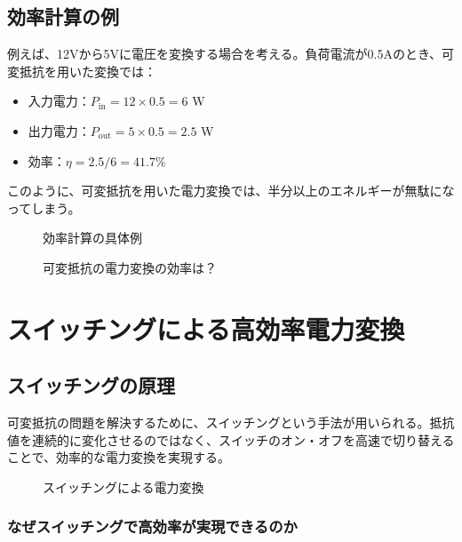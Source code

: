\subsection{効率計算の例}

例えば、12Vから5Vに電圧を変換する場合を考える。負荷電流が0.5Aのとき、可変抵抗を用いた変換では：

\begin{itemize}
\item 入力電力：$P_{\text{in}} = 12 \times 0.5 = 6$ W
\item 出力電力：$P_{\text{out}} = 5 \times 0.5 = 2.5$ W
\item 効率：$\eta = 2.5/6 = 41.7$\%
\end{itemize}

このように、可変抵抗を用いた電力変換では、半分以上のエネルギーが無駄になってしまう。

\begin{figure}[H]
\centering
{}
\caption{効率計算の具体例}
\label{fig:efficiency_calculation}
\end{figure}

\begin{figure}[H]
\centering
{}
\caption{可変抵抗の電力変換の効率は？}
\label{fig:resistor_efficiency}
\end{figure}

\section{スイッチングによる高効率電力変換}

\subsection{スイッチングの原理}

可変抵抗の問題を解決するために、スイッチングという手法が用いられる。抵抗値を連続的に変化させるのではなく、スイッチのオン・オフを高速で切り替えることで、効率的な電力変換を実現する。

\begin{figure}[H]
\centering
{}
\caption{スイッチングによる電力変換}
\label{fig:switching}
\end{figure}

\subsubsection{なぜスイッチングで高効率が実現できるのか}

